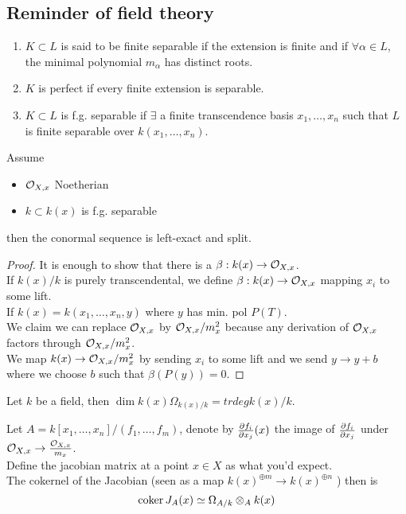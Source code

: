 \documentclass[../main.tex]{subfiles}
\begin{document}
\subsection{Reminder of field theory}
\begin{defn}
	\begin{enumerate}
	\item $K \subset L$ is said to be finite separable if the extension is finite and if $\forall \alpha \in L$, the minimal polynomial $m_\alpha$ has distinct roots.
	\item $K$ is perfect if every finite extension is separable.
	\item $K \subset L$ is f.g. separable if $\exists$ a finite transcendence basis $x_1,\ldots,x_n$ such that $L$ is finite separable over $k( x_1,\ldots,x_n) $.
	\end{enumerate}
\end{defn}
\begin{lemma}
Assume
\begin{itemize}
\item $\mathcal{O}_{X,x} $ Noetherian
\item $k \subset k( x) $ is f.g. separable
\end{itemize}
then the conormal sequence is left-exact and split.\\
\end{lemma}
\begin{proof}
It is enough to show that there is a $\beta: k( x) \to \mathcal{O}_{X,x} $.\\
If $k( x) /k$ is purely transcendental, we define $\beta: k( x) \to \mathcal{O}_{X,x} $ mapping $x_i $ to some lift.\\
If $k( x) = k( x_1,\ldots,x_n, y) $ where $y$ has min. pol $P( T) $.\\
We claim we can replace $\mathcal{O}_{X,x} $ by $ \mathcal{O}_{X,x} /m_x^{2}$ because any derivation of $\mathcal{O}_{X,x} $ factors through $\mathcal{O}_{X,x} / m_x^{2}$.\\
We map $k( x) \to \mathcal{O}_{X,x} / m_x^{2}$ by sending $x_i$ to some lift and we send $y\to y+b$ where we choose $b$ such that $\beta( P( y) ) =0$.
\end{proof}
\begin{lemma}
Let $k$ be a field, then $\dim k( x) \Omega_{k( x) /k} = trdeg k( x) /k$.
\end{lemma}
\begin{crly}
	Let $A= k[x_1,\ldots,x_n] / ( f_1,\ldots,f_m) $, denote by $ \frac{\partial f_i}{\partial x_j}( x) $ the image of $ \frac{\partial f_i}{\partial x_j}$ under $\mathcal{O}_{X,x} \to \frac{\mathcal{O}_{X,x} }{m_x}$.\\
	Define the jacobian matrix at a point $x\in X$ as what you'd expect.\\
	The cokernel of the Jacobian (seen as a map $k( x) ^{\oplus m}\to k( x) ^{\oplus n}$ ) then is
	\[ 
	\operatorname{coker} J_A( x) \simeq \Omega_{A /k} \otimes_A k( x) 
	\]
	
\end{crly}
\end{document}
